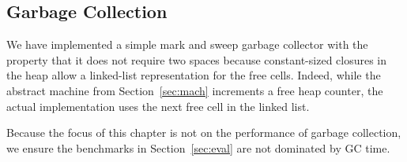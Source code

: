 \subsection{Garbage Collection}

We have implemented a simple mark and sweep garbage collector with the property
that it does not require two spaces because constant-sized closures in the
heap allow a linked-list representation for the free cells. Indeed,
while the abstract machine from Section~\ref{sec:mach} increments a free heap
counter, the actual implementation uses the next free cell in the linked list.

Because the focus of this chapter is not on the performance of garbage collection,
we ensure the benchmarks in Section~\ref{sec:eval} are not dominated by GC time.

